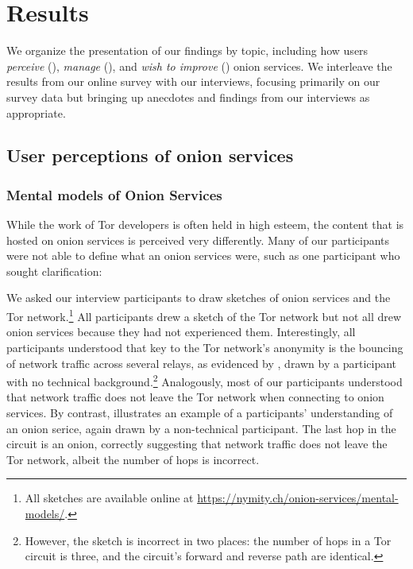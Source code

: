 \section{Results}
\label{sec:results}

We organize the presentation of our findings by topic, including how users
\emph{perceive} (), \emph{manage} (),
and \emph{wish to improve} () onion services.  We interleave the
results from our online survey with our interviews, focusing primarily on our
survey data but bringing up anecdotes and findings from our interviews as
appropriate.

\subsection{User perceptions of onion services}
\label{sec:perception}

\subsubsection{Mental models of Onion Services}
While the work of Tor developers is often held in high esteem, the content that
is hosted on onion services is perceived very differently.  Many of our participants were not able to define what an onion services were, such as one participant who sought clarification: 

We asked our interview participants to draw sketches of onion services and the Tor network.\footnote{All sketches are available online at
\url{https://nymity.ch/onion-services/mental-models/}.}  All participants drew a
sketch of the Tor network but not all drew onion services because they had not
experienced them.   Interestingly, all participants understood that key to the
Tor network's anonymity is the bouncing of network traffic across several
relays, as evidenced by , drawn by a participant with no
technical background.\footnote{However, the sketch is incorrect in two places: the
number of hops in a Tor circuit is three, and the circuit's forward and reverse
path are identical.} Analogously, most of our participants understood that
network traffic does not leave the Tor network when connecting to onion
services. By contrast,  illustrates an example of a participants' understanding of an onion serice, again drawn by a
non-technical participant.  The last hop in the circuit is an onion, correctly
suggesting that network traffic does not leave the Tor network, albeit the
number of hops is incorrect.

